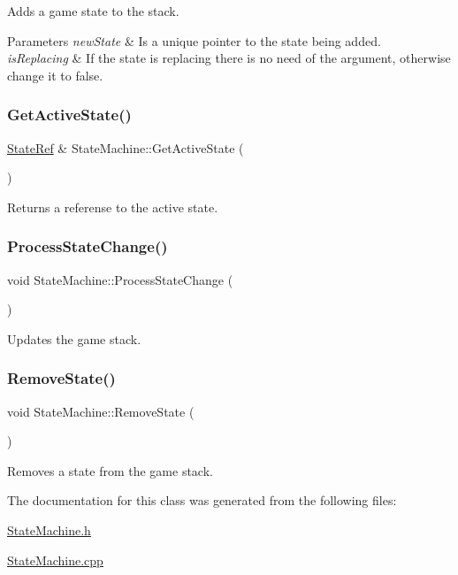 Adds a game state to the stack. 


\begin{DoxyParams}{Parameters}
{\em new\+State} & Is a unique pointer to the state being added. \\
\hline
{\em is\+Replacing} & If the state is replacing there is no need of the argument, otherwise change it to false. \\
\hline
\end{DoxyParams}
\mbox{\label{classStateMachine_a8ae5f91aa501e0fa07478d087814906e}} 
\subsubsection{\texorpdfstring{Get\+Active\+State()}{GetActiveState()}}
{\footnotesize\ttfamily \mbox{\hyperlink{StateMachine_8h_a217d9c9b187e9dd27abb46be48fb014d}{State\+Ref}} \& State\+Machine\+::\+Get\+Active\+State (\begin{DoxyParamCaption}{ }\end{DoxyParamCaption})}

Returns a referense to the active state. \mbox{\label{classStateMachine_a6758b622d0428a6ed72127cd5cbf1813}} 
\subsubsection{\texorpdfstring{Process\+State\+Change()}{ProcessStateChange()}}
{\footnotesize\ttfamily void State\+Machine\+::\+Process\+State\+Change (\begin{DoxyParamCaption}{ }\end{DoxyParamCaption})}

Updates the game stack. \mbox{\label{classStateMachine_aebefd3cef7db9e011e15f423061d1afc}} 
\subsubsection{\texorpdfstring{Remove\+State()}{RemoveState()}}
{\footnotesize\ttfamily void State\+Machine\+::\+Remove\+State (\begin{DoxyParamCaption}{ }\end{DoxyParamCaption})}

Removes a state from the game stack. 

The documentation for this class was generated from the following files\+:\begin{DoxyCompactItemize}
\item 
\mbox{\hyperlink{StateMachine_8h}{State\+Machine.\+h}}\item 
\mbox{\hyperlink{StateMachine_8cpp}{State\+Machine.\+cpp}}\end{DoxyCompactItemize}
